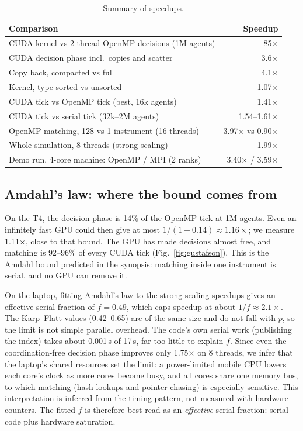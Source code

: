 \begin{table}[t]
\centering
\caption{Summary of speedups.}
\label{tab:speedups}
\footnotesize
\begin{tabularx}{\columnwidth}{@{}X r@{}}
\toprule
Comparison & Speedup\\
\midrule
CUDA kernel vs 2-thread OpenMP decisions (1M agents) & 85$\times$\\
CUDA decision phase incl.\ copies and scatter & 3.6$\times$\\
Copy back, compacted vs full & 4.1$\times$\\
Kernel, type-sorted vs unsorted & 1.07$\times$\\
CUDA tick vs OpenMP tick (best, 16k agents) & 1.41$\times$\\
CUDA tick vs serial tick (32k--2M agents) & 1.54--1.61$\times$\\
OpenMP matching, 128 vs 1 instrument (16 threads) & 3.97$\times$ vs 0.90$\times$\\
Whole simulation, 8 threads (strong scaling) & 1.99$\times$\\
Demo run, 4-core machine: OpenMP / MPI (2 ranks) & 3.40$\times$ / 3.59$\times$\\
\bottomrule
\end{tabularx}
\end{table}

\subsection{Amdahl's law: where the bound comes from}
On the T4, the decision phase is 14\% of the OpenMP tick at 1M agents. Even an infinitely fast GPU
could then give at most $1/(1-0.14) \approx 1.16\times$; we measure 1.11$\times$, close to that
bound. The GPU has made decisions almost free, and matching is 92--96\% of every CUDA tick
(Fig.~\ref{fig:gustafson}). This is the Amdahl bound predicted in the synopsis: matching inside one
instrument is serial, and no GPU can remove it.

On the laptop, fitting Amdahl's law to the strong-scaling speedups gives an effective serial
fraction of $f=0.49$, which caps speedup at about $1/f \approx 2.1\times$. The Karp--Flatt values
(0.42--0.65) are of the same size and do not fall with $p$, so the limit is not simple parallel
overhead. The code's own serial work (publishing the index) takes about 0.001\,s of 17\,s, far too
little to explain $f$. Since even the coordination-free decision phase improves only 1.75$\times$
on 8 threads, we infer that the laptop's shared resources set the limit: a power-limited mobile
CPU lowers each core's clock as more cores become busy, and all cores share one memory bus, to
which matching (hash lookups and pointer chasing) is especially sensitive. This interpretation is
inferred from the timing pattern, not measured with hardware counters. The fitted $f$ is therefore
best read as an \emph{effective} serial fraction: serial code plus hardware saturation.

